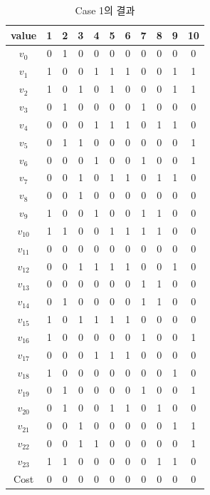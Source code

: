 \documentclass{article}
\begin{document}
    \begin{table}[htb!]
    \centering
    \begin{tabular}{c | c c c c c c c c c c}
        \hline
        value & 1 & 2 & 3 & 4 & 5 & 6 & 7 & 8 & 9 & 10 \\
        \hline
        $v_0$ & 0 & 1 & 0 & 0 & 0 & 0 & 0 & 0 & 0 & 0 \\
        $v_1$ & 1 & 0 & 0 & 1 & 1 & 1 & 0 & 0 & 1 & 1 \\
        $v_2$ & 1 & 0 & 1 & 0 & 1 & 0 & 0 & 0 & 1 & 1 \\
        $v_3$ & 0 & 1 & 0 & 0 & 0 & 0 & 1 & 0 & 0 & 0 \\
        $v_4$ & 0 & 0 & 0 & 1 & 1 & 1 & 0 & 1 & 1 & 0 \\
        $v_5$ & 0 & 1 & 1 & 0 & 0 & 0 & 0 & 0 & 0 & 1 \\
        $v_6$ & 0 & 0 & 0 & 1 & 0 & 0 & 1 & 0 & 0 & 1 \\
        $v_7$ & 0 & 0 & 1 & 0 & 1 & 1 & 0 & 1 & 1 & 0 \\
        $v_8$ & 0 & 0 & 1 & 0 & 0 & 0 & 0 & 0 & 0 & 0 \\
        $v_9$ & 1 & 0 & 0 & 1 & 0 & 0 & 1 & 1 & 0 & 0 \\
        $v_{10}$ & 1 & 1 & 0 & 0 & 1 & 1 & 1 & 1 & 0 & 0 \\
        $v_{11}$ & 0 & 0 & 0 & 0 & 0 & 0 & 0 & 0 & 0 & 0 \\
        $v_{12}$ & 0 & 0 & 1 & 1 & 1 & 1 & 0 & 0 & 1 & 0 \\
        $v_{13}$ & 0 & 0 & 0 & 0 & 0 & 0 & 1 & 1 & 0 & 0 \\
        $v_{14}$ & 0 & 1 & 0 & 0 & 0 & 0 & 1 & 1 & 0 & 0 \\
        $v_{15}$ & 1 & 0 & 1 & 1 & 1 & 1 & 0 & 0 & 0 & 0 \\
        $v_{16}$ & 1 & 0 & 0 & 0 & 0 & 0 & 1 & 0 & 0 & 1 \\
        $v_{17}$ & 0 & 0 & 0 & 1 & 1 & 1 & 0 & 0 & 0 & 0 \\
        $v_{18}$ & 1 & 0 & 0 & 0 & 0 & 0 & 0 & 0 & 1 & 0 \\
        $v_{19}$ & 0 & 1 & 0 & 0 & 0 & 0 & 1 & 0 & 0 & 1 \\
        $v_{20}$ & 0 & 1 & 0 & 0 & 1 & 1 & 0 & 1 & 0 & 0 \\
        $v_{21}$ & 0 & 0 & 1 & 0 & 0 & 0 & 0 & 0 & 1 & 1 \\
        $v_{22}$ & 0 & 0 & 1 & 1 & 0 & 0 & 0 & 0 & 0 & 1 \\
        $v_{23}$ & 1 & 1 & 0 & 0 & 0 & 0 & 0 & 1 & 1 & 0 \\
        \hline
        Cost & 0 & 0 & 0 & 0 & 0 & 0 & 0 & 0 & 0 & 0 \\
        \hline
    \end{tabular}
    \caption{Case 1의 결과}
    \label{tab:result1}
    \end{table}
\end{document}
